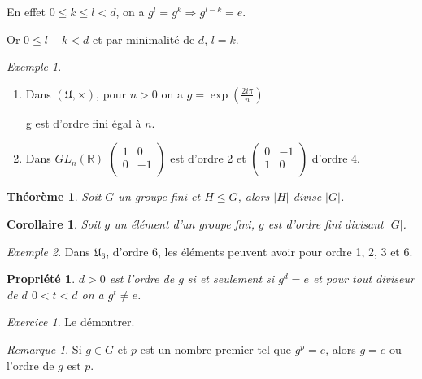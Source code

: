 \documentclass[]{article}
\newtheorem{mythm}{Théorème}
\newtheorem{myproperty}{Propriété}
\newtheorem{mycor}{Corollaire}
\theoremstyle{remark}
\newtheorem{myrem}{Remarque}
\newtheorem{myexer}{Exercice}
\newtheorem{myexmpl}{Exemple}
\theoremstyle{definition}
\begin{document}
En effet $0 \leqslant k \leqslant l < d$, on a $g^l=g^k \Longrightarrow g^{l-k}=e$.

Or $0 \leqslant l - k < d$ et par minimalité de $d$, $l=k$.

\begin{myexmpl}
	\leavevmode
	\begin{enumerate}
		\item Dans $(\mathfrak{U}, \times)$, pour $n > 0$ on a $g=\exp\left(\frac{2i \pi}{n}\right)$
		
		g est d'ordre fini égal à $n$.
		
		\item Dans $GL_n(\mathbb{R})$ $\left(\begin{array}{cc}
			1 & 0 \\
			0 & -1 \\
		\end{array}\right)$ est d'ordre 2 et $\left(\begin{array}{cc}
					0 & -1 \\
					1 & 0 \\
				\end{array}\right)$ d'ordre 4.
	\end{enumerate}
\end{myexmpl}

\begin{mythm}
	Soit $G$ un groupe fini et $H \leqslant G$, alors $|H|$ divise  $|G|$. 
\end{mythm}

\begin{mycor}
	Soit $g$ un élément d'un groupe fini, $g$ est d'ordre fini divisant $|G|$.
\end{mycor}

\begin{myexmpl}
	Dans $\mathfrak{U}_6$, d'ordre 6, les éléments peuvent avoir pour ordre 1, 2, 3 et 6.
\end{myexmpl}

\begin{myproperty}
	$d > 0$ est l'ordre de $g$ si et seulement si $g^d=e$ et pour tout diviseur de $d$ $0 < t < d$ on a $g^t \neq e$.
\end{myproperty}

\begin{myexer}
	Le démontrer.
\end{myexer}

\begin{myrem}
	Si $g \in G$ et $p$ est un nombre premier tel que $g^p=e$, alors $g=e$ ou l'ordre de $g$ est $p$.
\end{myrem}
\end{document}
